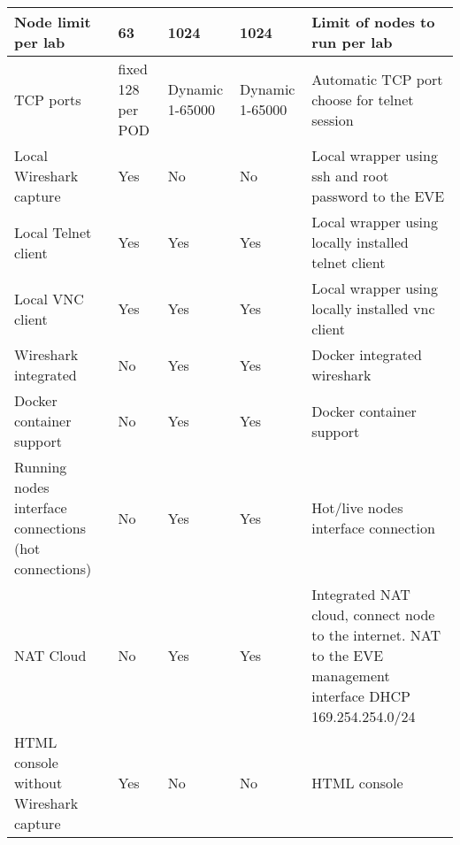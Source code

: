 \begin{longtable}{| m{3cm} | m{2cm} | m{2cm} | m{2cm} | m{4cm} |}
Node limit per lab                                    & 63                & 1024            & 1024                 & Limit of nodes to run per lab                                                                                 \\ \hline
TCP ports                                             & fixed 128 per POD & Dynamic 1-65000 & Dynamic 1-65000      & Automatic TCP port choose for telnet session                                                                  \\ \hline
Local Wireshark capture                               & Yes               & No              & No                   & Local wrapper using ssh and root password to the EVE                                                          \\ \hline
Local Telnet client                                   & Yes               & Yes             & Yes                  & Local wrapper using locally installed telnet client                                                           \\ \hline
Local VNC client                                      & Yes               & Yes             & Yes                  & Local wrapper using locally installed vnc client                                                              \\ \hline
Wireshark integrated                                  & No                & Yes             & Yes                  & Docker integrated wireshark                                                                                   \\ \hline
Docker container support                              & No                & Yes             & Yes                  & Docker container support                                                                                      \\ \hline
Running nodes interface connections (hot connections) & No                & Yes             & Yes                  & Hot/live nodes interface connection                                                                           \\ \hline
NAT Cloud                                             & No                & Yes             & Yes                  & Integrated NAT cloud, connect node to the internet. NAT to the EVE management interface DHCP 169.254.254.0/24 \\ \hline
HTML console without Wireshark capture                & Yes               & No              & No                   & HTML console                                                                                                  \\ \hline

\end{longtable}
